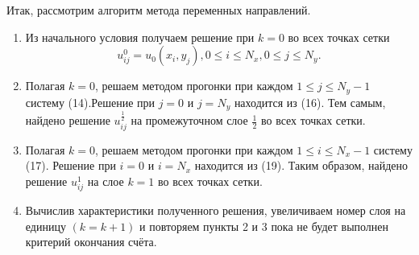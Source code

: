 \documentclass[a4paper, 12pt]{article}
\begin{document}
	Итак, рассмотрим алгоритм метода переменных направлений.
	\begin{enumerate}
		\item Из начального условия получаем решение при $k=0$ во всех точках сетки 	$$u^0_{i j} = u_0(x_i, y_j), 0 \le i \le N_x, 0 \le j \le N_y.$$
		\item Полагая $k = 0$, решаем методом прогонки при каждом $1 \le j \le N_y-1$ систему (14).\newline Решение при $j = 0$ и $j = N_y$ находится из  (16). Тем самым, найдено решение $u^{\frac{1}{2}}_{i j}$ на промежуточном слое $\frac{1}{2}$ во всех точках сетки.
		\item Полагая $k = 0$, решаем методом прогонки при каждом $1 \le i \le N_x-1$ систему (17). \newline Решение при $i = 0$ и $i = N_x$ находится из (19). Таким образом, найдено решение $u^{1}_{i j}$ на слое $k = 1$ во всех точках сетки.
		\item Вычислив характеристики полученного решения, увеличиваем номер слоя на единицу $(k = k+1)$ и повторяем пункты 2 и 3 пока не будет выполнен критерий окончания счёта.
	\end{enumerate}

	\newpage
\end{document}
